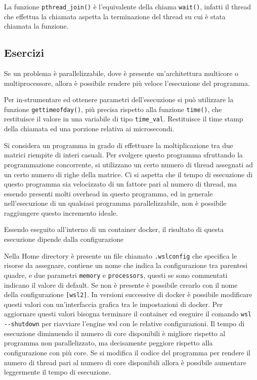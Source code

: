 \documentclass{article}
\numberwithin{equation}{subsection}
\begin{document}

La funzione \verb|pthread_join()| è l'equivalente della chiama \verb|wait()|, infatti il thread che effettua la chiamata aspetta la terminazione del thread su 
cui è stata chiamata la funzione. 


\subsection{Esercizi}


Se un problema è parallelizzabile, dove è presente un'architettura multicore o multiprocessore, allora è possibile rendere più veloce 
l'esecuzione del programma. 

Per in-strumentare ed ottenere parametri dell'esecuzione si può utilizzare la funzione \verb|gettimeofday()|, più precisa rispetto alla funzione \verb|time()|, 
che restituisce il valore in una variabile di tipo \verb|time_val|. Restituisce il time stamp della chiamata ed una porzione relativa ai microsecondi. 


Si considera un programma in grado di effettuare la moltiplicazione tra due matrici riempite di interi casuali. Per svolgere questo programma sfruttando la 
programmazione concorrente, si utilizzano un certo numero di thread assegnati ad un certo numero di righe della matrice. Ci si aspetta che il tempo di esecuzione 
di questo programma sia velocizzato di un fattore pari al numero di thread, ma essendo presenti molti overhead in questo programma, ed in generale nell'esecuzione di 
un qualsiasi programma parallelizzabile, non è possibile raggiungere questo incremento ideale. 


Essendo eseguito all'interno di un container docker, il risultato di questa esecuzione dipende dalla configurazione 


Nella Home directory è presente un file chiamato \verb|.wslconfig| che specifica le risorse da assegnare, contiene un nome che indica la configurazione tra 
parentesi quadre, e due parametri \verb|memory| e \verb|processors|, questi se sono commentati indicano il valore di default. Se non è presente è possibile 
crearlo con il nome della configurazione \verb|[wsl2]|. In versioni successive di docker è possibile modificare questi valori con un'interfaccia grafica 
tra le impostazioni di docker. 
Per aggiornare questi valori bisogna terminare il container ed eseguire il comando \verb|wsl --shutdown| per riavviare l'engine wsl con le relative configurazioni. 
Il tempo di esecuzione diminuendo il numero di core disponibili è migliore rispetto al programma non parallelizzato, ma decisamente peggiore rispetto alla configurazione 
con più core. Se si modifica il codice del programma per rendere il numero di thread pari al numero di core disponibili allora è possibile aumentare leggermente il 
tempo di esecuzione. 
\end{document}
